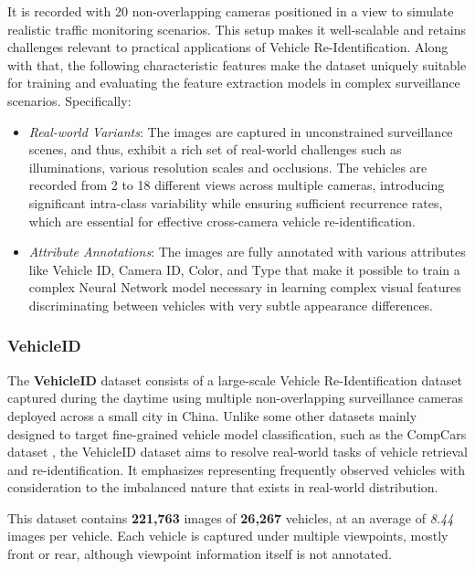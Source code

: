 It is recorded with 20 non-overlapping cameras positioned in a view to simulate realistic traffic monitoring scenarios. This setup makes it well-scalable and retains challenges relevant to practical applications of Vehicle Re-Identification. Along with that, the following characteristic features make the dataset uniquely suitable for training and evaluating the feature extraction models in complex surveillance scenarios. Specifically:

\begin{itemize}
    \item \textit{Real-world Variants}: The images are captured in unconstrained surveillance scenes, and thus, exhibit a rich set of real-world challenges such as illuminations, various resolution scales and occlusions. The vehicles are recorded from 2 to 18 different views across multiple cameras, introducing significant intra-class variability while ensuring sufficient recurrence rates, which are essential for effective cross-camera vehicle re-identification.
    \item \textit{Attribute Annotations}: The images are fully annotated with various attributes like Vehicle ID, Camera ID, Color, and Type that make it possible to train a complex Neural Network model necessary in learning complex visual features discriminating between vehicles with very subtle appearance differences.
\end{itemize}

\subsubsection{VehicleID}
The \textbf{VehicleID} \cite{VehicleID} dataset consists of a large-scale Vehicle Re-Identification dataset captured during the daytime using multiple non-overlapping surveillance cameras deployed across a small city in China. Unlike some other datasets mainly designed to target fine-grained vehicle model classification, such as the CompCars dataset \cite{CompCars}, the VehicleID dataset aims to resolve real-world tasks of vehicle retrieval and re-identification. It emphasizes representing frequently observed vehicles with consideration to the imbalanced nature that exists in real-world distribution.

This dataset contains \textbf{221,763} images of \textbf{26,267} vehicles, at an average of \textit{8.44} images per vehicle. Each vehicle is captured under multiple viewpoints, mostly front or rear, although viewpoint information itself is not annotated.

